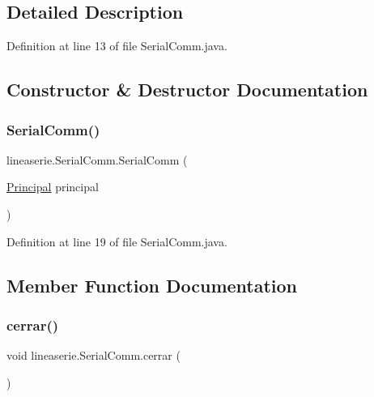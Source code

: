 \subsection{Detailed Description}


Definition at line 13 of file Serial\+Comm.\+java.



\subsection{Constructor \& Destructor Documentation}
\mbox{\label{classlineaserie_1_1_serial_comm_af7acba71f36fc78ac2555f52cb6e6c91}} 
\subsubsection{\texorpdfstring{Serial\+Comm()}{SerialComm()}}
{\footnotesize\ttfamily lineaserie.\+Serial\+Comm.\+Serial\+Comm (\begin{DoxyParamCaption}\item[{\mbox{\hyperlink{classvistas_1_1_principal}{Principal}}}]{principal }\end{DoxyParamCaption})}



Definition at line 19 of file Serial\+Comm.\+java.



\subsection{Member Function Documentation}
\mbox{\label{classlineaserie_1_1_serial_comm_a4bc07b152edbc3d04b42677ee93e3504}} 
\subsubsection{\texorpdfstring{cerrar()}{cerrar()}}
{\footnotesize\ttfamily void lineaserie.\+Serial\+Comm.\+cerrar (\begin{DoxyParamCaption}{ }\end{DoxyParamCaption})}



